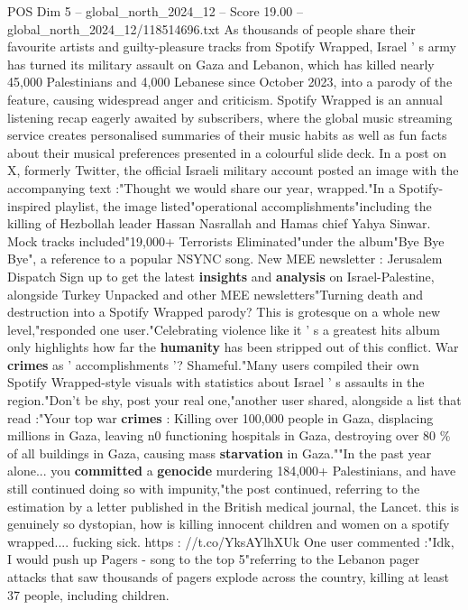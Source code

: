 \begin{textsample}{POS Dim 5 – global\_north\_2024\_12 – Score 19.00 – global\_north\_2024\_12/118514696.txt}  \label{ex:f5_pos_095}
As thousands of people share their favourite artists and guilty-pleasure tracks from Spotify Wrapped, Israel ' s army has turned its military assault on Gaza and Lebanon, which has killed nearly 45,000 Palestinians and 4,000 Lebanese since October 2023, into a parody of the feature, causing widespread anger and criticism.
Spotify Wrapped is an annual listening recap eagerly awaited by subscribers, where the global music streaming service creates personalised summaries of their music habits as well as fun facts about their musical preferences presented in a colourful slide deck.
In a post on X, formerly Twitter, the official Israeli military account posted an image with the accompanying text :"Thought we would share our year, wrapped."In a Spotify-inspired playlist, the image listed"operational accomplishments"including the killing of Hezbollah leader Hassan Nasrallah and Hamas chief Yahya Sinwar.
Mock tracks included"19,000+ Terrorists Eliminated"under the album"Bye Bye Bye", a reference to a popular NSYNC song.
New MEE newsletter : Jerusalem Dispatch Sign up to get the latest \textbf{insights} and \textbf{analysis} on Israel-Palestine, alongside Turkey Unpacked and other MEE newsletters"Turning death and destruction into a Spotify Wrapped parody?
This is grotesque on a whole new level,"responded one user."Celebrating violence like it ' s a greatest hits album only highlights how far the \textbf{humanity} has been stripped out of this conflict.
War \textbf{crimes} as ' accomplishments '?
Shameful."Many users compiled their own Spotify Wrapped-style visuals with statistics about Israel ' s assaults in the region."Don't be shy, post your real one,"another user shared, alongside a list that read :"Your top war \textbf{crimes} : Killing over 100,000 people in Gaza, displacing millions in Gaza, leaving n0 functioning hospitals in Gaza, destroying over 80 \% of all buildings in Gaza, causing mass \textbf{starvation} in Gaza.""In the past year alone... you \textbf{committed} a \textbf{genocide} murdering 184,000+ Palestinians, and have still continued doing so with impunity,"the post continued, referring to the estimation by a letter published in the British medical journal, the Lancet. this is genuinely so dystopian, how is killing innocent children and women on a spotify wrapped.... fucking sick. https : //t.co/YksAYlhXUk One user commented :"Idk, I would push up Pagers - song to the top 5"referring to the Lebanon pager attacks that saw thousands of pagers explode across the country, killing at least 37 people, including children.

\end{textsample}
